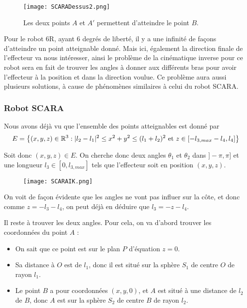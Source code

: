 \begin{itemize}
\begin{figure}[!ht]
\centering
\texttt{[image: SCARADessus2.png]}
\caption{Les deux points $A$ et $A'$ permettent d'atteindre le point $B$.}
\label{SCARA}
\end{figure}

Pour le robot 6R, ayant 6 degrés de liberté, il y a une infinité de façons d'atteindre un point atteignable donné. Mais ici, également la direction finale de l'effecteur va nous intéresser, ainsi le problème de la cinématique inverse pour ce robot sera en fait de trouver les angles à donner aux différents bras pour avoir l'effecteur à la position et dans la direction voulue. Ce problème aura aussi plusieurs solutions, à cause de phénomènes similaires à celui du robot SCARA.
\end{itemize}

\subsubsection{Robot SCARA}

Nous avons déjà vu que l'ensemble des points atteignables est donné par 
$$E = \left \lbrace (x,y,z)\in \mathbb{R}^3 : |l_2-l_1|^2 \leq x^2+y^2 \leq (l_1+l_2)^2 \text{ et } z\in [-l_{3,max}-l_4, l_4]\right \rbrace$$

Soit donc $(x,y,z)\in E$. On cherche donc deux angles $\theta_1$ et $\theta_2$ dans $]-\pi, \pi]$ et une longueur $l_3 \in [0,l_{3,max}]$ tels que l'effecteur soit en position $(x,y,z)$. 

\begin{figure}[!ht]
\centering
\texttt{[image: SCARAIK.png]}
\end{figure}

On voit de façon évidente que les angles ne vont pas influer sur la côte, et donc comme $z=-l_3-l_4$, on peut déjà en déduire que $l_3 = -z-l_4$. 

Il reste à trouver les deux angles. Pour cela, on va d'abord trouver les coordonnées du point $A$ : 

\begin{itemize}
\item On sait que ce point est sur le plan $P$ d'équation $z=0$. 
\item Sa distance à $O$ est de $l_1$, donc il est situé sur la sphère $S_1$ de centre $O$ de rayon $l_1$. 
\item Le point $B$ a pour coordonnées $(x,y,0)$, et $A$ est situé à une distance de $l_2$ de $B$, donc $A$ est sur la sphère $S_2$ de centre $B$ de rayon $l_2$. 
\end{itemize}

